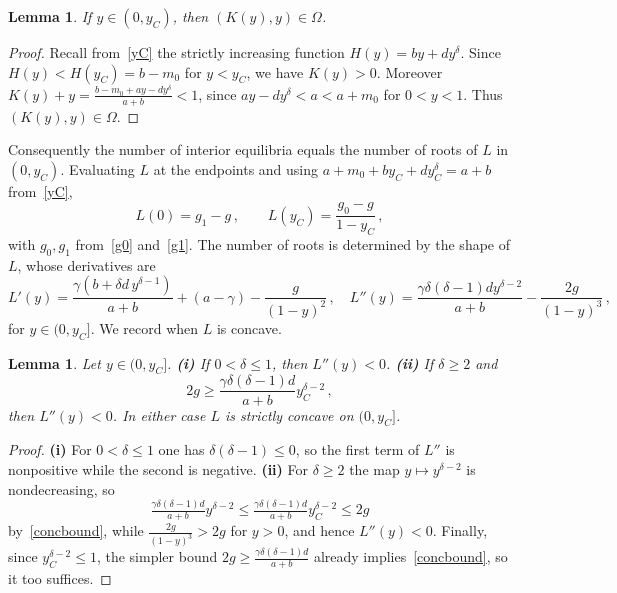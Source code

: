 \documentclass[reqno,11pt]{amsart}
\newtheorem{lem}[thm]{Lemma}
\numberwithin{equation}{section}
\begin{document}
\begin{lem}\label{lem:inOmega}
If $y\in(0,y_C)$, then $(K(y),y)\in\Omega$.
\end{lem}

\begin{proof}
Recall from~\eqref{yC} the strictly increasing function $H(y)=by+dy^{\delta}$. Since $H(y)<H(y_C)=b-m_0$ for $y<y_C$, we have $K(y)>0$. Moreover $K(y)+y=\tfrac{b-m_0+ay-dy^{\delta}}{a+b}<1$, since $ay-dy^{\delta}<a<a+m_0$ for $0<y<1$. Thus $(K(y),y)\in\Omega$.
\end{proof}

Consequently the number of interior equilibria equals the number of roots of $L$ in $(0,y_C)$. Evaluating $L$ at the endpoints and using $a+m_0+by_C+dy_C^{\delta}=a+b$ from~\eqref{yC},
\begin{equation}\label{Lends}
L(0)=g_1-g\,,\qquad L(y_C)=\frac{g_0-g}{1-y_C}\,,
\end{equation}
with $g_0,g_1$ from~\eqref{g0} and~\eqref{g1}. The number of roots is determined by the shape of $L$, whose derivatives are
\begin{equation}\label{Lderivs}
L'(y)=\frac{\gamma(b+\delta d\,y^{\delta-1})}{a+b}+(a-\gamma)-\frac{g}{(1-y)^2}\,,\quad
L''(y)=\frac{\gamma\delta(\delta-1)dy^{\delta-2}}{a+b}-\frac{2g}{(1-y)^3}\,,
\end{equation}
for $y\in(0,y_C]$. We record when $L$ is concave.


\begin{lem}\label{lem:concavity}
Let $y\in(0,y_C]$. {\bf (i)} If $0<\delta\le1$, then $L''(y)<0$. {\bf (ii)} If $\delta\ge2$ and
\begin{equation}\label{concbound}
2g\ge\frac{\gamma\delta(\delta-1)d}{a+b}y_C^{\delta-2}\,,
\end{equation}
then $L''(y)<0$. In either case $L$ is strictly concave on $(0,y_C]$.
\end{lem}


\begin{proof}
{\bf (i)} For $0<\delta\le1$ one has $\delta(\delta-1)\le0$, so the first term of $L''$ is nonpositive while the second is negative. {\bf (ii)} For $\delta\ge2$ the map $y\mapsto y^{\delta-2}$ is nondecreasing, so 
\[
\tfrac{\gamma\delta(\delta-1)d}{a+b}y^{\delta-2}\le\tfrac{\gamma\delta(\delta-1)d}{a+b}y_C^{\delta-2}\le 2g
\]
by~\eqref{concbound}, while $\tfrac{2g}{(1-y)^3}>2g$ for $y>0$, and hence $L''(y)<0$. Finally, since $y_C^{\delta-2}\le1$, the simpler bound $2g\ge\tfrac{\gamma\delta(\delta-1)d}{a+b}$ already implies~\eqref{concbound}, so it too suffices.
\end{proof}
\end{document}
